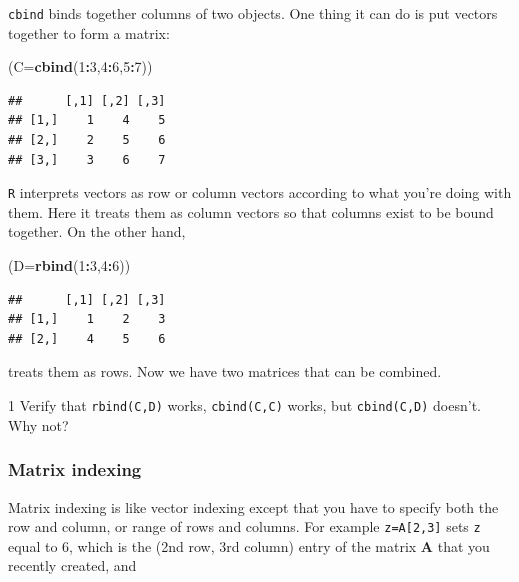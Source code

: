 \documentclass[11pt,]{article}
\newenvironment{Shaded}{\begin{snugshade}}{\end{snugshade}}
\newcommand{\DataTypeTok}[1]{\textcolor[rgb]{0.13,0.29,0.53}{#1}}
\newcommand{\DecValTok}[1]{\textcolor[rgb]{0.00,0.00,0.81}{#1}}
\newcommand{\KeywordTok}[1]{\textcolor[rgb]{0.13,0.29,0.53}{\textbf{#1}}}
\newcommand{\NormalTok}[1]{#1}
\newcommand{\OperatorTok}[1]{\textcolor[rgb]{0.81,0.36,0.00}{\textbf{#1}}}
\let\BeginKnitrBlock\begin \let\EndKnitrBlock\end
\begin{document}
\texttt{cbind} binds together columns of two objects. One thing it can do is put vectors together to form a matrix:

\begin{Shaded}
\begin{Highlighting}[]
\NormalTok{(}\DataTypeTok{C=}\KeywordTok{cbind}\NormalTok{(}\DecValTok{1}\OperatorTok{:}\DecValTok{3}\NormalTok{,}\DecValTok{4}\OperatorTok{:}\DecValTok{6}\NormalTok{,}\DecValTok{5}\OperatorTok{:}\DecValTok{7}\NormalTok{))}
\end{Highlighting}
\end{Shaded}

\begin{verbatim}
##      [,1] [,2] [,3]
## [1,]    1    4    5
## [2,]    2    5    6
## [3,]    3    6    7
\end{verbatim}

\texttt{R} interprets vectors as row or column vectors according to what you're doing with them. Here it treats them as column vectors so that columns exist to be bound together. On the other hand,

\begin{Shaded}
\begin{Highlighting}[]
\NormalTok{(}\DataTypeTok{D=}\KeywordTok{rbind}\NormalTok{(}\DecValTok{1}\OperatorTok{:}\DecValTok{3}\NormalTok{,}\DecValTok{4}\OperatorTok{:}\DecValTok{6}\NormalTok{))}
\end{Highlighting}
\end{Shaded}

\begin{verbatim}
##      [,1] [,2] [,3]
## [1,]    1    2    3
## [2,]    4    5    6
\end{verbatim}

treats them as rows. Now we have two matrices that can be combined.

\BeginKnitrBlock{exercisebox}{1}
Verify that \texttt{rbind(C,D)} works, \texttt{cbind(C,C)} works, but \texttt{cbind(C,D)} doesn't. Why not?
\EndKnitrBlock{exercisebox}

\hypertarget{matrix-indexing}{%
\subsubsection{Matrix indexing}\label{matrix-indexing}}

Matrix indexing is like vector indexing except that you have to specify both the row and column, or range of rows and columns. For example \texttt{z=A{[}2,3{]}} sets \texttt{z} equal to 6, which is the (2nd row, 3rd column) entry of the matrix \textbf{A} that you recently created, and
\end{document}
